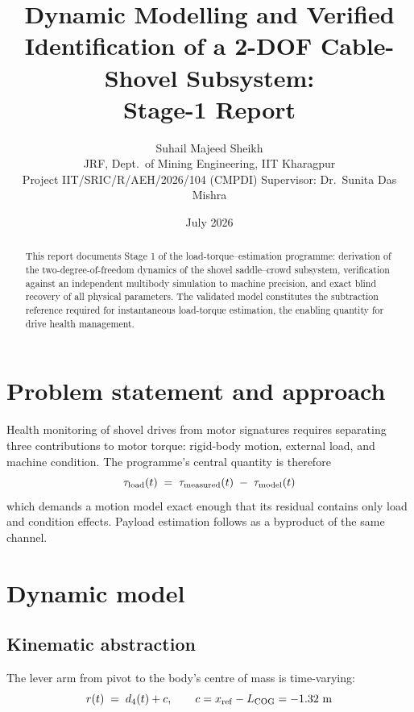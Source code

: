 \documentclass[11pt,a4paper]{article}
\title{Dynamic Modelling and Verified Identification of a 2-DOF Cable-Shovel
       Subsystem:\\ Stage-1 Report}
\author{Suhail Majeed Sheikh \\ \small JRF, Dept.\ of Mining Engineering, IIT Kharagpur
        \\ \small Project IIT/SRIC/R/AEH/2026/104 (CMPDI) \quad Supervisor: Dr.\ Sunita Das Mishra}
\date{July 2026}
\begin{document}
\maketitle

\begin{abstract}
This report documents Stage 1 of the load-torque--estimation programme:
derivation of the two-degree-of-freedom dynamics of the shovel saddle--crowd
subsystem, verification against an independent multibody simulation to machine
precision, and exact blind recovery of all physical parameters. The validated
model constitutes the subtraction reference required for instantaneous
load-torque estimation, the enabling quantity for drive health management.
\end{abstract}

\section{Problem statement and approach}          %
Health monitoring of shovel drives from motor signatures requires separating
three contributions to motor torque: rigid-body motion, external load, and
machine condition. The programme's central quantity is therefore
\begin{equation}\tau_{\mathrm{load}}(t) \;=\; \tau_{\mathrm{measured}}(t) \;-\; \tau_{\mathrm{model}}(t)\label{eq:core}\end{equation}
which demands a motion model exact enough that its residual contains only
load and condition effects. Payload estimation follows as a byproduct of the
same channel.

\section{Dynamic model}                            %
\subsection{Kinematic abstraction}
The lever arm from pivot to the body's centre of mass is time-varying:
\begin{equation}r(t) \;=\; d_4(t) + c, \qquad c = x_{\mathrm{ref}} - L_{\mathrm{COG}} = -1.32\ \mathrm{m}\label{eq:lever}\end{equation}
\end{document}

